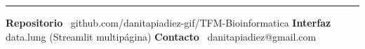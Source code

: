 \documentclass[10pt, a4paper, landscape]{article}
\begin{document}
\vspace{-0.4em}
{\color{uaxblue}\rule{\textwidth}{1.2pt}}
\vspace{-0.1em}

\begin{center}
{\footnotesize
\textbf{\color{uaxdark}Repositorio}~
\textcolor{uaxblue}{github.com/danitapiadiez-gif/TFM-Bioinformatica}
\quad{\color{mute}$|$}\quad
\textbf{\color{uaxdark}Interfaz}~
\textcolor{ink2}{data.lung (Streamlit multip\'agina)}
\quad{\color{mute}$|$}\quad
\textbf{\color{uaxdark}Contacto}~
\textcolor{uaxblue}{danitapiadiez@gmail.com}}
\end{center}
\end{document}
